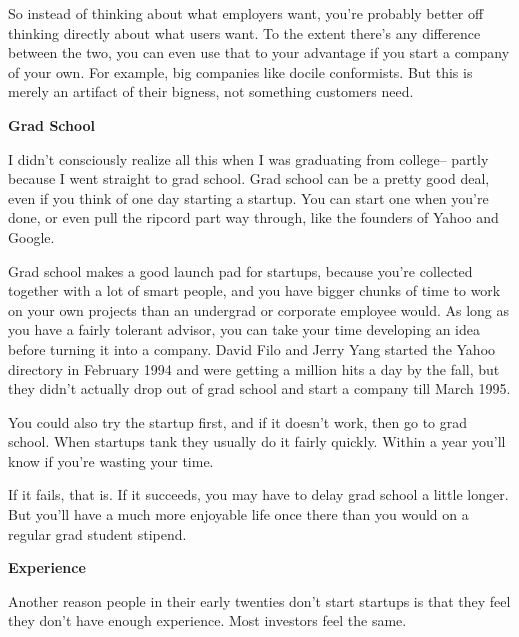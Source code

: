 So
                  instead of thinking about what employers want, you're probably
                  better off thinking directly about what users want. To the
                  extent there's any difference between the two, you can even
                  use that to your advantage if you start a company of your own.
                  For example, big companies like docile conformists. But this
                  is merely an artifact of their bigness, not something
                  customers need.

\textbf{Grad School}

I
                  didn't consciously realize all this when I was graduating from
                  college-- partly because I went straight to grad school. Grad
                  school can be a pretty good deal, even if you think of one day
                  starting a startup. You can start one when you're done, or
                  even pull the ripcord part way through, like the founders of
                  Yahoo and Google.

Grad school makes a good launch
                  pad for startups, because you're collected together with a lot
                  of smart people, and you have bigger chunks of time to work on
                  your own projects than an undergrad or corporate employee
                  would. As long as you have a fairly tolerant advisor, you can
                  take your time developing an idea before turning it into a
                  company. David Filo and Jerry Yang started the Yahoo directory
                  in February 1994 and were getting a million hits a day by the
                  fall, but they didn't actually drop out of grad school and
                  start a company till March 1995.

You could also try
                  the startup first, and if it doesn't work, then go to grad
                  school. When startups tank they usually do it fairly quickly.
                  Within a year you'll know if you're wasting your time.

If
                  it fails, that is. If it succeeds, you may have to delay grad
                  school a little longer. But you'll have a much more enjoyable
                  life once there than you would on a regular grad student
                  stipend.

\textbf{Experience}

Another
                  reason people in their early twenties don't start startups is
                  that they feel they don't have enough experience. Most
                  investors feel the same.

